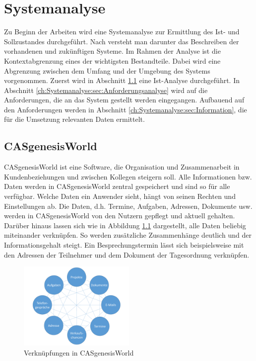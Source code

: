 
\chapter{Systemanalyse}
\label{ch:Systemanalyse}

Zu Beginn der Arbeiten wird eine Systemanalyse zur Ermittlung des Ist- und Sollzustandes durchgeführt. Nach \cite{SWB-380277719} versteht man darunter das Beschreiben der vorhandenen und zukünftigen Systeme. Im Rahmen der Analyse ist die Kontextabgrenzung eines der wichtigsten Bestandteile. Dabei wird eine Abgrenzung zwischen dem Umfang und der Umgebung des Systems vorgenommen. Zuerst wird in Abschnitt \ref{ch:Systemanalyse:sec:genesisWorld} eine Ist-Analyse durchgeführt. In Abschnitt \ref{ch:Systemanalyse:sec:Anforderungsanalyse} wird auf die Anforderungen, die an das System gestellt werden eingegangen. Aufbauend auf den Anforderungen werden in Abschnitt \ref{ch:Systemanalyse:sec:Information}, die für die Umsetzung relevanten Daten ermittelt. 

\section{CASgenesisWorld}
\label{ch:Systemanalyse:sec:genesisWorld}

CASgenesisWorld ist eine Software, die Organisation und Zusammenarbeit in Kundenbeziehungen und zwischen Kollegen steigern soll. Alle Informationen bzw. Daten werden in CASgenesisWorld zentral gespeichert und sind so für alle verfügbar. Welche Daten ein Anwender sieht, hängt von seinen Rechten und Einstellungen ab. Die Daten, d.h. Termine, Aufgaben, Adressen, Dokumente usw. werden in CASgenesisWorld von den Nutzern gepflegt und aktuell gehalten. Darüber hinaus lassen sich wie in Abbildung \ref{picGwCon} dargestellt, alle Daten beliebig miteinander verknüpfen. So werden zusätzliche Zusammenhänge deutlich und der Informationsgehalt steigt. Ein Besprechungstermin lässt sich beispielsweise mit den Adressen der Teilnehmer und dem Dokument der Tagesordnung verknüpfen.

\begin{figure}[H]
	\centering
  \includegraphics[width=0.5\textwidth, width=0.5\textwidth]{pics/CAS_connections.pdf}
	\caption{Verknüpfungen in CASgenesisWorld}
	\label{picGwCon}
\end{figure}

